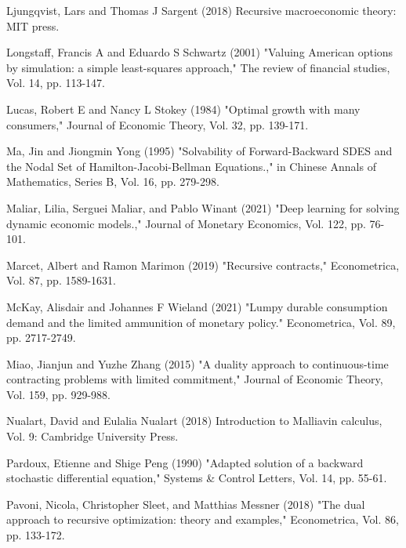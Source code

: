 \documentclass{article}
\begin{document}
\begin{thebibliography}{99}
 Ljungqvist, Lars and Thomas J Sargent (2018) Recursive macroeconomic theory: MIT press.

 Longstaff, Francis A and Eduardo S Schwartz (2001) "Valuing American options by simulation: a simple least-squares approach," The review of financial studies, Vol. 14, pp. 113-147.

\clearpage

 Lucas, Robert E and Nancy L Stokey (1984) "Optimal growth with many consumers," Journal of Economic Theory, Vol. 32, pp. 139-171.

 Ma, Jin and Jiongmin Yong (1995) "Solvability of Forward-Backward SDES and the Nodal Set of Hamilton-Jacobi-Bellman Equations.," in Chinese Annals of Mathematics, Series B, Vol. 16, pp. 279-298.

 Maliar, Lilia, Serguei Maliar, and Pablo Winant (2021) "Deep learning for solving dynamic economic models.," Journal of Monetary Economics, Vol. 122, pp. 76-101.

 Marcet, Albert and Ramon Marimon (2019) "Recursive contracts," Econometrica, Vol. 87, pp. 1589-1631.

 McKay, Alisdair and Johannes F Wieland (2021) "Lumpy durable consumption demand and the limited ammunition of monetary policy." Econometrica, Vol. 89, pp. 2717-2749.

 Miao, Jianjun and Yuzhe Zhang (2015) "A duality approach to continuous-time contracting problems with limited commitment," Journal of Economic Theory, Vol. 159, pp. 929-988.

 Nualart, David and Eulalia Nualart (2018) Introduction to Malliavin calculus, Vol. 9: Cambridge University Press.

 Pardoux, Etienne and Shige Peng (1990) "Adapted solution of a backward stochastic differential equation," Systems \& Control Letters, Vol. 14, pp. 55-61.

 Pavoni, Nicola, Christopher Sleet, and Matthias Messner (2018) "The dual approach to recursive optimization: theory and examples," Econometrica, Vol. 86, pp. 133-172.


\end{thebibliography}
\end{document}
